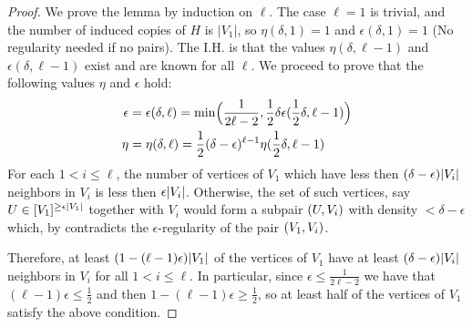 \begin{lemma}
\begin{proof}
                We prove the lemma by induction on $\ell$.
                The case $\ell=1$ is trivial, and the number of induced copies of $H$ is $|V_1|$, so $\eta(\delta, 1) = 1$ and
                $\epsilon(\delta, 1) = 1$ (No regularity needed if no pairs).
                The I.H. is that the values $\eta(\delta, \ell-1)$ and $\epsilon(\delta, \ell-1)$ exist and are known for all
                $\ell$.
                We proceed to prove that the following values $\eta$ and $\epsilon$ hold:
                \begin{align*}
                    \epsilon &= \epsilon(\delta, \ell)
                        = \min \Bigl( \frac{1}{2\ell - 2}, \frac{1}{2} \delta \epsilon(\frac{1}{2}\delta, \ell-1) \Bigr) \\
                    \eta &= \eta(\delta, \ell)
                        = \frac{1}{2} (\delta - \epsilon)^{\ell-1} \eta(\frac{1}{2}\delta, \ell-1)
                \end{align*}
                For each $1 < i \leq \ell$, the number of vertices of $V_1$ which have less then
                $(\delta - \epsilon) | V_i |$ neighbors in $V_i$ is less then $\epsilon | V_i |$.
                Otherwise, the set of such vertices, say $U \in [V_1]^{\geq \epsilon | V_1 |}$ together with $V_i$
                would form a subpair $( U, V_i )$ with density $< \delta - \epsilon$ which, by
                 contradicts the $\epsilon$-regularity of the pair $( V_1, V_i )$.

                Therefore, at least $(1 - (\ell -1) \epsilon) | V_1 |$ of the vertices of $V_1$ have at least
                $(\delta - \epsilon) | V_i |$ neighbors in $V_i$ for all $1 < i \leq \ell$.
                In particular, since $\epsilon \leq \frac{1}{2\ell - 2}$ we have that $(\ell - 1) \epsilon \leq \frac{1}{2}$
                and then $1 - (\ell - 1) \epsilon \geq \frac{1}{2}$, so at least half of the vertices of $V_1$ satisfy the
                above condition.


\end{proof}
\end{lemma}

